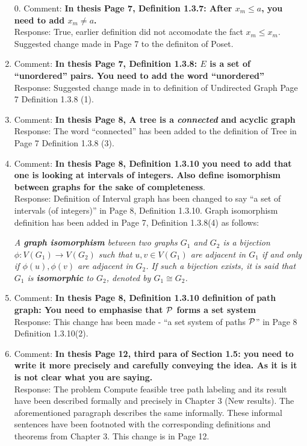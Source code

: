 \documentclass[12pt,a4paper]{article}
\begin{document}
\begin{enumerate}
\item[0.] Comment: {\bf In thesis Page 7, Definition 1.3.7: After $x_m
    \le a$, you need to add $x_m \ne a$.}\\
  Response: True, earlier definition did not accomodate the fact $x_m
  \le x_m$. Suggested change made in Page 7 to the definiton of Poset.

\item Comment: {\bf In thesis Page 7, Definition 1.3.8: $E$ is a set
    of ``unordered'' pairs. You need to add the
    word ``unordered''}\\
  Response: Suggested change made in to definition of Undirected Graph
  Page 7 Definition 1.3.8 (1).

\item Comment: {\bf In thesis Page 8, A tree is a {\em connected} and
    acyclic graph}\\
  Response: The word ``connected'' has been added to the definition of
  Tree in Page 7 Definition 1.3.8 (3).

\item Comment: {\bf In thesis Page 8, Definition 1.3.10 you need to
    add that one is looking at intervals of integers. Also define
    isomorphism between graphs for the sake of completeness}.\\
  Response: Definition of Interval graph has been changed to say ``a
  set of intervals (of integers)'' in Page 8, Definition 1.3.10. Graph
  isomorphism definition has been added in Page 7, Definition 1.3.8(4)
  as follows:

  {\em A \textbf{graph isomorphism} between two graphs $G_1$ and $G_2$
    is a bijection $\phi: V(G_1) \rightarrow V(G_2)$ such that $u, v
    \in V(G_1)$ are adjacent in $G_1$ if and only if $\phi(u),
    \phi(v)$ are adjacent in $G_2$. If such a bijection exists, it is
    said that $G_1$ is \textbf{isomorphic} to $G_2$, denoted by $G_1
    \cong G_2$.}

\item Comment: {\bf In thesis Page 8, Definition 1.3.10 definition of
    path graph: You need to emphasise that ${\cal P}$ forms a set system}\\
  Response: This change has been made - ``a set system of paths
  ${\cal P}$'' in Page 8 Definition 1.3.10(2).

\item Comment: {\bf In thesis Page 12, third para of Section 1.5: you
    need to write it more precisely and carefully conveying the
    idea. As it is it is not clear what you are saying.}\\
  Response: The problem {\sc Compute feasible tree path labeling} and
  its result have been described formally and precisely in Chapter 3
  (New results). The aforementioned paragraph describes the same
  informally. These informal sentences have been footnoted with the
  corresponding definitions and theorems from Chapter 3. This change
  is in Page 12.


\end{enumerate}
\end{document}
